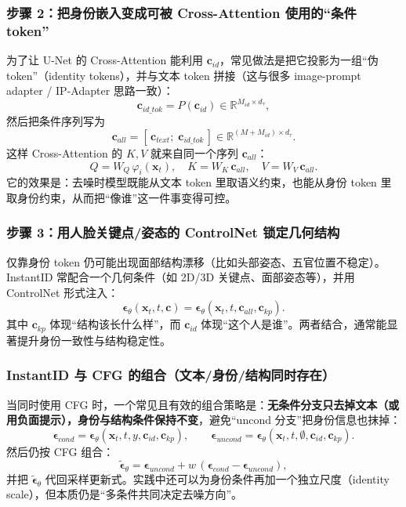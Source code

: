 \documentclass[zihao=-4, fontset=windows]{ctexart}
\begin{document}
\subsubsection{步骤 2：把身份嵌入变成可被 Cross-Attention 使用的“条件 token”}
为了让 U-Net 的 Cross-Attention 能利用 $\mathbf{c}_{id}$，常见做法是把它投影为一组“伪 token”（identity tokens），并与文本 token 拼接（这与很多 image-prompt adapter / IP-Adapter 思路一致）：
\begin{equation}
    \mathbf{c}_{id\_tok} = P(\mathbf{c}_{id})\in\mathbb{R}^{M_{id}\times d_\tau},
\end{equation}
然后把条件序列写为
\begin{equation}
    \mathbf{c}_{all} = [\,\mathbf{c}_{text};\;\mathbf{c}_{id\_tok}\,] \in \mathbb{R}^{(M+M_{id})\times d_\tau}.
\end{equation}
这样 Cross-Attention 的 $K,V$ 就来自同一个序列 $\mathbf{c}_{all}$：
\begin{equation}
    Q=W_Q\,\varphi_i(\mathbf{x}_t),\quad K=W_K\,\mathbf{c}_{all},\quad V=W_V\,\mathbf{c}_{all}.
\end{equation}
它的效果是：去噪时模型既能从文本 token 里取语义约束，也能从身份 token 里取身份约束，从而把“像谁”这一件事变得可控。

\subsubsection{步骤 3：用人脸关键点/姿态的 ControlNet 锁定几何结构}
仅靠身份 token 仍可能出现面部结构漂移（比如头部姿态、五官位置不稳定）。InstantID 常配合一个几何条件（如 2D/3D 关键点、面部姿态等），并用 ControlNet 形式注入：
\begin{equation}
    \boldsymbol\epsilon_\theta(\mathbf{x}_t,t,\mathbf{c}) = \boldsymbol\epsilon_\theta(\mathbf{x}_t,t,\mathbf{c}_{all},\mathbf{c}_{kp}).
\end{equation}
其中 $\mathbf{c}_{kp}$ 体现“结构该长什么样”，而 $\mathbf{c}_{id}$ 体现“这个人是谁”。两者结合，通常能显著提升身份一致性与结构稳定性。

\subsubsection{InstantID 与 CFG 的组合（文本/身份/结构同时存在）}
当同时使用 CFG 时，一个常见且有效的组合策略是：\textbf{无条件分支只去掉文本（或用负面提示），身份与结构条件保持不变}，避免“uncond 分支”把身份信息也抹掉：
\begin{equation}
    \boldsymbol\epsilon_{cond}=\boldsymbol\epsilon_\theta(\mathbf{x}_t,t, y,\mathbf{c}_{id},\mathbf{c}_{kp}),\qquad
    \boldsymbol\epsilon_{uncond}=\boldsymbol\epsilon_\theta(\mathbf{x}_t,t, \emptyset,\mathbf{c}_{id},\mathbf{c}_{kp}).
\end{equation}
然后仍按 CFG 组合：
\begin{equation}
    \tilde{\boldsymbol\epsilon}_\theta=\boldsymbol\epsilon_{uncond}+w\,(\boldsymbol\epsilon_{cond}-\boldsymbol\epsilon_{uncond}),
\end{equation}
并把 $\tilde{\boldsymbol\epsilon}_\theta$ 代回采样更新式。实践中还可以为身份条件再加一个独立尺度（identity scale），但本质仍是“多条件共同决定去噪方向”。
\end{document}
